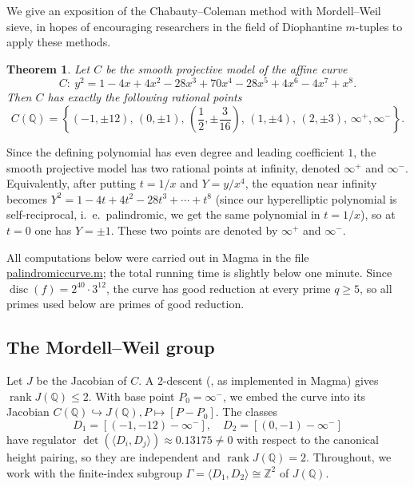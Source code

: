 \documentclass{article}
\theoremstyle{plain}
\newtheorem{theorem}{Theorem}
\newcommand{\Z}{\mathbb{Z}}
\newcommand{\Q}{\mathbb{Q}}
\begin{document}
We give an exposition of the Chabauty--Coleman method with Mordell--Weil sieve, in hopes of encouraging researchers in the field of Diophantine \(m\)-tuples to apply these methods.


\begin{theorem}\label{thm:points}
Let \(C\) be the smooth projective model of the affine curve
\[
C:\ y^2= 1 - 4 x + 4 x^2 - 28 x^3 + 70 x^4 - 28 x^5 + 4 x^6 - 4 x^7 + x^8.
\]
Then \(C\) has exactly the following rational points
\[
C(\Q)=
\left\{
(-1,\pm 12),\,
(0,\pm 1),\,
\left(\frac12,\pm \frac{3}{16}\right),\,
(1,\pm 4),\,
(2,\pm 3),\,
\infty^+,\infty^-
\right\}.
\]
\end{theorem}
Since the defining polynomial has even degree and leading coefficient \(1\), the smooth projective model has two rational points at infinity, denoted \(\infty^+\) and \(\infty^-\). Equivalently, after putting \(t=1/x\) and \(Y=y/x^4\), the equation near infinity becomes
\( Y^2 = 1 - 4t + 4t^2 - 28t^3 + \cdots + t^8 \) (since our hyperelliptic polynomial is self-reciprocal, i.~e.~palindromic, we get the same polynomial in \(t=1/x\)),
so at \(t=0\) one has \(Y=\pm 1\). These two points are denoted by \(\infty^+\) and \(\infty^-\).


All computations below were carried out in {\sc Magma} \cite{BosmaCannonPlayoust1997} in the file \href{https://github.com/NikolaAdzaga/TorsionRegularTriples/blob/main/palindromic_curve.m}{palindromic\textunderscore curve.m};
the total running time is slightly below one minute.
Since $\operatorname{disc}(f)=2^{40}\cdot 3^{12}$, the curve has good reduction at
every prime $q\geqslant 5$, so all primes used below are primes of good reduction.

\subsection{The Mordell--Weil group}

Let $J$ be the Jacobian of $C$. A $2$-descent
(\cite{Stoll2001}, as implemented in {\sc Magma}) gives
$\operatorname{rank} J(\Q)\leqslant 2$. With base point $P_0=\infty^-$, we embed the curve into its Jacobian \(C(\Q) \hookrightarrow J(\Q), P \mapsto [P-P_0]\). The classes
\[
  D_1 = [(-1,-12)-\infty^-], \quad D_2 = [(0,-1)-\infty^-]
\]
have regulator $\det\left(\langle D_i,D_j\rangle\right)\approx 0.13175\neq 0$
with respect to the canonical height pairing, so they are independent and
$\operatorname{rank} J(\Q)=2$. Throughout, we work with the finite-index subgroup
$\Gamma=\langle D_1,D_2\rangle\cong\Z^2$ of $J(\Q)$.
\end{document}
